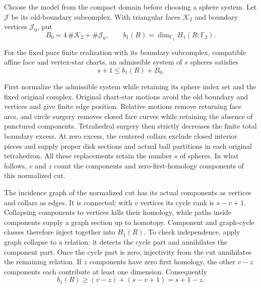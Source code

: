 Choose the model from the compact domain before choosing a sphere system.
Let $\mathcal J$ be its old-boundary subcomplex. With triangular faces
$\mathcal K_2$ and boundary vertices $\mathcal J_0$, put
\[
 B_0=4\,\#\mathcal K_2+\#\mathcal J_0,\qquad
 b_1(R)=\dim_{\mathbb F_2}H_1(R;\mathbb F_2).
\]
\begin{theorem}
\label{thm:prime-sphere-bound}
For the fixed pure finite realization with its boundary subcomplex,
compatible affine face and vertex-star charts, an admissible system of
$s$ spheres satisfies
\begin{equation}
 s+1\leq b_1(R)+B_0.\label{eq:prime-sphere-bound}
\end{equation}
\end{theorem}

First normalize the admissible system while retaining its sphere index
set and the fixed original complex. Original chart-star motions avoid the
old boundary and vertices and give finite edge position. Relative motions
remove returning face arcs, and circle surgery removes closed face curves
while retaining the absence of punctured components. Tetrahedral surgery
then strictly decreases the finite total boundary excess. At zero excess,
the centered collars exclude closed interior pieces and supply proper disk
sections and actual ball partitions in each original tetrahedron. All
these replacements retain the number $s$ of spheres. In what follows,
$v$ and $z$ count the components and zero-first-homology components of
this normalized cut.

The incidence graph of the normalized cut has its actual components as
vertices and collars as edges. It is connected; with $v$ vertices its cycle rank is
$s-v+1$. Collapsing components to vertices kills their homology, while
paths inside components supply a graph section up to homotopy. Component
and graph-cycle classes therefore inject together into $H_1(R)$. To check
independence, apply graph collapse to a relation: it detects the cycle
part and annihilates the component part. Once the cycle part is zero,
injectivity from the cut annihilates the remaining relation. If $z$
components have zero first homology, the other $v-z$ components each
contribute at least one dimension. Consequently
\[
 b_1(R)\geq(v-z)+(s-v+1)=s+1-z.
\]

